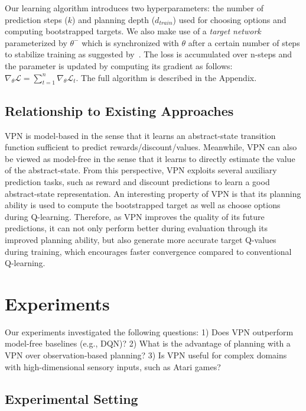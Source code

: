 \documentclass{article}
\newcommand{\supplementary}{Appendix}
\newcommand{\cutsectionup}{\vspace*{-0.05in}}
\newcommand{\cutsectiondown}{\vspace*{-0.03in}}
\newcommand{\cutsubsectionup}{\vspace*{-0.04in}}
\newcommand{\cutsubsectiondown}{\vspace*{-0.03in}}
\begin{document}
Our learning algorithm introduces two hyperparameters: the number of prediction steps ($k$) and planning depth ($d_{train}$) used for choosing options and computing bootstrapped targets. We also make use of a \textit{target network} parameterized by $\theta^-$ which is synchronized with $\theta$ after a certain number of steps to stabilize training as suggested by~\cite{mnih2016asynchronous}. The loss is accumulated over n-steps and the parameter is updated by computing its gradient as follows: $\nabla_{\theta}\mathcal{L} =\sum_{t=1}^{n}\nabla_{\theta}\mathcal{L}_t$.
The full algorithm is described in the \supplementary.

\cutsubsectionup
\subsection{Relationship to Existing Approaches}\label{sec:relationship}
\cutsubsectiondown
VPN is model-based in the sense that it learns an abstract-state transition function sufficient to predict rewards/discount/values. Meanwhile, VPN can also be viewed as model-free in the sense that it learns to directly estimate the value of the abstract-state. From this perspective, VPN exploits several auxiliary prediction tasks, such as reward and discount predictions to learn a good abstract-state representation. 
An interesting property of VPN is that its planning ability is used to compute the bootstrapped target as well as choose options during Q-learning. Therefore, as VPN improves the quality of its future predictions, it can not only perform better during evaluation through its improved planning ability, but also generate more accurate target Q-values during training, which encourages faster convergence compared to conventional Q-learning.

\cutsectionup
\section{Experiments}
\cutsectiondown
Our experiments investigated the following questions: 1) Does VPN outperform model-free baselines (e.g., DQN)? 2) What is the advantage of planning with a VPN over observation-based planning? 3) Is VPN useful for complex domains with high-dimensional sensory inputs, such as Atari games?




\cutsectionup
\subsection{Experimental Setting} \label{exp:setting}
\cutsectiondown
\end{document}
